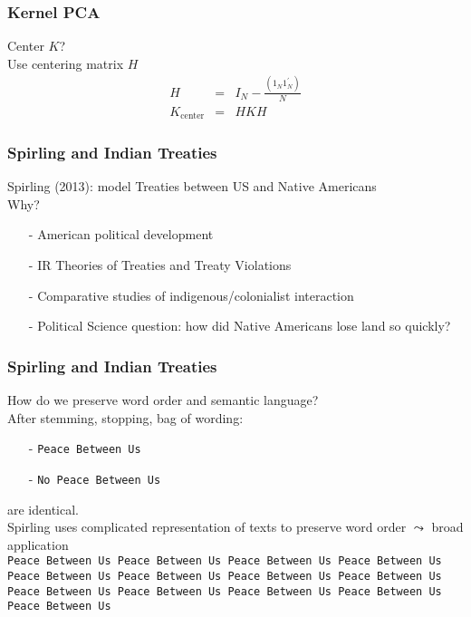 \begin{frame}[fragile]
\frametitle{Kernel PCA}

Center ${K}$?\\

Use centering matrix ${H}$
\begin{eqnarray}
{H}  & = & {I}_{N}  - \frac{({1}_{N} {1}_{N}^{'})}{N} \nonumber \\
{K}_{\text{center}} & = & {H} {K} {H} \nonumber 
\end{eqnarray}



\end{frame}




\begin{frame}[fragile]
\frametitle{Spirling and Indian Treaties}


\alert{Spirling (2013)}: model Treaties between US and Native Americans  \\
Why?
\begin{itemize}
\item[-] American political development
\item[-] IR Theories of Treaties and Treaty Violations
\item[-] Comparative studies of indigenous/colonialist interaction 
\item[-] \alert{Political Science question}: how did Native Americans lose land so quickly?
\end{itemize}


\end{frame}


\begin{frame}[fragile]
\frametitle{Spirling and Indian Treaties}


How do we preserve word order and semantic language?  \\

After stemming, stopping, bag of wording:   
\begin{itemize}
\item[-] {\tt Peace Between Us}  
\item[-] {\tt No Peace Between Us} 
\end{itemize}
  
 are identical.  \\
 
 Spirling uses complicated representation of texts to preserve word order $\leadsto$ broad application\\ 
\tt \alert{Peac}e Between Us
\tt P\alert{eace} Between Us 
\tt Pe\alert{ace }Between Us
\tt Pea\alert{ce B}etween Us
\tt Peac\alert{e Be}tween Us
\tt Peace\alert{ Bet}ween Us
\tt Peace \alert{Betw}een Us
\tt Peace B\alert{etwe}en Us
\tt Peace Be\alert{twee}n Us
\tt Peace Bet\alert{ween} Us 
\tt Peace Betw\alert{een }Us
\tt Peace Betwe\alert{en U}s
\tt Peace Betwee\alert{n Us}





\end{frame}

